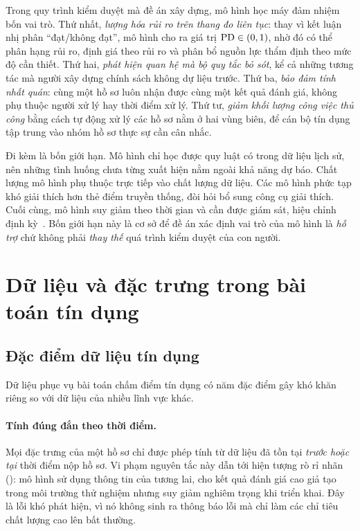 Trong quy trình kiểm duyệt mà đề án xây dựng, mô hình học máy đảm nhiệm bốn vai
trò. Thứ
nhất, \textit{lượng hóa rủi ro trên thang đo liên tục}: thay vì kết luận nhị phân
``đạt/không đạt'', mô hình cho ra giá trị $\mathrm{PD} \in (0, 1)$, nhờ đó có thể phân
hạng rủi ro, định giá theo rủi ro và phân bổ nguồn lực thẩm định theo mức độ cần
thiết. Thứ hai, \textit{phát hiện quan hệ mà bộ quy tắc bỏ sót}, kể cả những
tương tác mà người xây dựng chính sách không dự liệu trước. Thứ ba, \textit{bảo
đảm tính nhất quán}: cùng một hồ sơ luôn nhận được cùng một kết quả đánh giá,
không phụ thuộc người xử lý hay thời điểm xử lý. Thứ tư, \textit{giảm khối lượng
công việc thủ công} bằng cách tự động xử lý các hồ sơ nằm ở hai vùng biên, để cán
bộ tín dụng tập trung vào nhóm hồ sơ thực sự cần cân nhắc.

Đi kèm là bốn giới hạn. Mô hình chỉ học được quy luật có trong dữ liệu lịch sử,
nên những tình huống chưa từng xuất hiện nằm ngoài khả năng dự báo. Chất lượng mô
hình phụ thuộc trực tiếp vào chất lượng dữ liệu. Các mô hình phức tạp khó giải
thích hơn thẻ điểm truyền thống, đòi hỏi bổ sung công cụ giải thích. Cuối cùng,
mô hình suy giảm theo thời gian và cần được giám sát, hiệu chỉnh định
kỳ~\cite{sculley2015}. Bốn giới hạn này là cơ sở để đề án xác định vai trò của mô
hình là \textit{hỗ trợ} chứ không phải \textit{thay thế} quá trình kiểm duyệt của
con người.

\section{Dữ liệu và đặc trưng trong bài toán tín dụng}
\label{sec:du-lieu-dac-trung}

\subsection{Đặc điểm dữ liệu tín dụng}
\label{subsec:dac-diem-du-lieu}

Dữ liệu phục vụ bài toán chấm điểm tín dụng có năm đặc điểm gây khó khăn riêng so
với dữ liệu của nhiều lĩnh vực khác.

\paragraph{Tính đúng đắn theo thời điểm.} Mọi đặc trưng của một hồ sơ chỉ được
phép tính từ dữ liệu đã tồn tại \textit{trước hoặc tại} thời điểm nộp hồ sơ. Vi
phạm nguyên tắc này dẫn tới hiện tượng rò rỉ nhãn (): mô hình
sử dụng thông tin của tương lai, cho kết quả đánh giá cao giả tạo trong môi
trường thử nghiệm nhưng suy giảm nghiêm trọng khi triển khai. Đây là lỗi khó phát
hiện, vì nó không sinh ra thông báo lỗi mà chỉ làm các chỉ tiêu chất lượng cao
lên bất thường.

